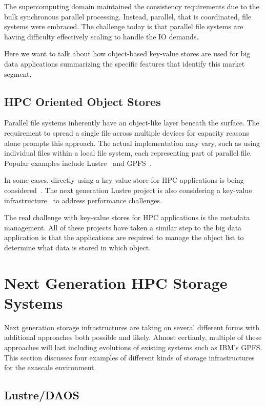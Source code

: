 The supercomputing domain maintained the consistency requirements due to the
bulk synchronous parallel processing. Instead, parallel, that is coordinated,
file systems were embraced. The challenge today is that parallel file systems
are having difficulty effectively scaling to handle the IO demands.

Here we want to talk about how object-based key-value stores are used for big
data applications summarizing the specific features that identify this market
segment.

\subsection{HPC Oriented Object Stores}

Parallel file systems inherently have an object-like layer beneath the surface.
The requirement to spread a single file across multiple devices for capacity
reasons alone prompts this approach. The actual implementation may vary, such
as using individual files within a local file system, each representing part
of parallel file. Popular examples include
Lustre~\cite{braam:2002:lustre-arch} and GPFS~\cite{schmuck:2002:gpfs}.

In some cases, directly using a key-value store for HPC applications is being
considered~\cite{yin:2014:key-value-parallel}. The next generation Lustre
project is also considering a key-value infrastructure~\cite{barton:2013:lustre}
to address performance challenges.

The real challenge with key-value stores for HPC applications is the metadata
management. All of these projects have taken a similar step to the big data
application is that the applications are required to manage the object list to
determine what data is stored in which object.

\section{Next Generation HPC Storage Systems}\label{sec:intro}

Next generation storage infrastructures are taking on several different forms
with additional approaches both possible and likely. Almost certianly, multiple
of these approaches will last including evolutions of existing systems such
as IBM's GPFS. This section discusses four examples of different kinds of
storage infrastructures for the exascale environment.

\subsection{Lustre/DAOS}

